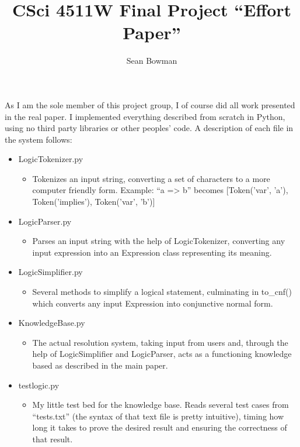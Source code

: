 \documentclass[english]{article}
\begin{document}
\title{CSci 4511W Final Project {}``Effort Paper''}


\author{Sean Bowman}

\maketitle
As I am the sole member of this project group, I of course did all
work presented in the real paper. I implemented everything described
from scratch in Python, using no third party libraries or other peoples'
code. A description of each file in the system follows:
\begin{itemize}
\item LogicTokenizer.py

\begin{itemize}
\item Tokenizes an input string, converting a set of characters to a more
computer friendly form. Example: {}``a => b'' becomes {[}Token('var',
'a'), Token('implies'), Token('var', 'b'){]}
\end{itemize}
\item LogicParser.py

\begin{itemize}
\item Parses an input string with the help of LogicTokenizer, converting
any input expression into an Expression class representing its meaning.
\end{itemize}
\item LogicSimplifier.py

\begin{itemize}
\item Several methods to simplify a logical statement, culminating in to\_cnf()
which converts any input Expression into conjunctive normal form.
\end{itemize}
\item KnowledgeBase.py

\begin{itemize}
\item The actual resolution system, taking input from users and, through
the help of LogicSimplifier and LogicParser, acts as a functioning
knowledge based as described in the main paper.
\end{itemize}
\item testlogic.py

\begin{itemize}
\item My little test bed for the knowledge base. Reads several test cases
from {}``tests.txt'' (the syntax of that text file is pretty intuitive),
timing how long it takes to prove the desired result and ensuring
the correctness of that result.
\end{itemize}
\end{itemize}
\end{document}
